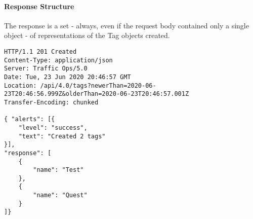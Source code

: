 \paragraph{Response Structure}
The response is a set - always, even if the request body contained only a single
object - of representations of the Tag objects created.

\begin{codelisting}
\begin{verbatim}
HTTP/1.1 201 Created
Content-Type: application/json
Server: Traffic Ops/5.0
Date: Tue, 23 Jun 2020 20:46:57 GMT
Location: /api/4.0/tags?newerThan=2020-06-23T20:46:56.999Z&olderThan=2020-06-23T20:46:57.001Z
Transfer-Encoding: chunked

{ "alerts": [{
	"level": "success",
	"text": "Created 2 tags"
}],
"response": [
	{
		"name": "Test"
	},
	{
		"name": "Quest"
	}
]}
\end{verbatim}
\end{codelisting}
